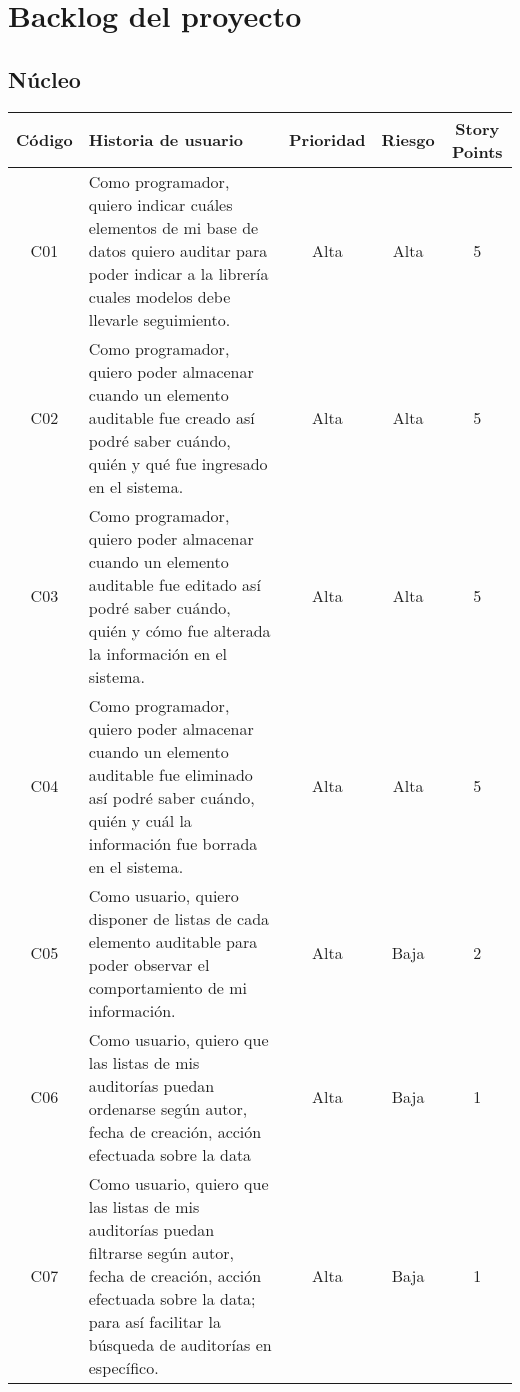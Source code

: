 \chapter{Backlog del proyecto}

\section*{Núcleo}

\begin{longtable}{| c | p{8cm} | c |c | c |}
\hline
Código & Historia de usuario                                                                                                                                                                                & Prioridad & Riesgo & Story Points \\ \hline
C01    & Como programador, quiero indicar cuáles elementos de mi base de datos quiero auditar para poder indicar a la librería cuales modelos debe llevarle seguimiento.                                    & Alta      & Alta   & 5            \\ \hline
C02    & Como programador, quiero poder almacenar cuando un elemento auditable fue creado así podré saber cuándo, quién y qué fue ingresado en el sistema.                                                  & Alta      & Alta   & 5            \\ \hline
C03    & Como programador, quiero poder almacenar cuando un elemento auditable fue editado así podré saber cuándo, quién y cómo fue alterada la información en el sistema.                                  & Alta      & Alta   & 5            \\ \hline
C04    & Como programador, quiero poder almacenar cuando un elemento auditable fue eliminado así podré saber cuándo, quién y cuál la información fue borrada en el sistema.                                 & Alta      & Alta   & 5            \\ \hline
C05    & Como usuario, quiero disponer de listas de cada elemento auditable para poder observar el comportamiento de mi información.                                                                        & Alta      & Baja   & 2            \\ \hline
C06    & Como usuario, quiero que las listas de mis auditorías puedan ordenarse según autor, fecha de creación, acción efectuada sobre la data                                                              & Alta      & Baja   & 1            \\ \hline
C07    & Como usuario, quiero que las listas de mis auditorías puedan filtrarse según autor, fecha de creación, acción efectuada sobre la data; para así facilitar la búsqueda de auditorías en específico. & Alta      & Baja   & 1            \\ \hline

\end{longtable}
